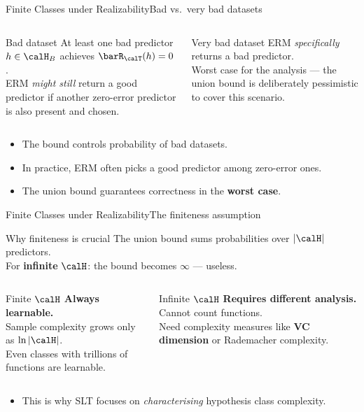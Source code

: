 \begin{frame}{Finite Classes under Realizability}{Bad vs.\ very bad datasets}
  \begin{columns}[T]
    \begin{alertblock}{Bad dataset}
      At least one bad predictor $h \in \calH_B$ achieves $\barR_\calT(h) = 0$.\\[4pt]
      ERM \emph{might still} return a good predictor if another zero-error predictor is
      also present and chosen.
    \end{alertblock}
    \begin{alertblock}{Very bad dataset}
      ERM \emph{specifically} returns a bad predictor.\\[4pt]
      Worst case for the analysis — the union bound is deliberately pessimistic to cover
      this scenario.
    \end{alertblock}
  \end{columns}
  \bigskip
  \begin{itemize}
    \item The bound controls probability of bad datasets.
    \item In practice, ERM often picks a good predictor among zero-error ones.
    \item The union bound guarantees correctness in the \textbf{worst case}.
  \end{itemize}
\end{frame}

\begin{frame}{Finite Classes under Realizability}{The finiteness assumption}
  \begin{alertblock}{Why finiteness is crucial}
    The union bound sums probabilities over $|\calH|$ predictors.\\
    For \textbf{infinite} $\calH$: the bound becomes $\infty$ — useless.
  \end{alertblock}
  \bigskip
  \begin{columns}[T]
    \begin{block}{Finite $\calH$}
      \textbf{Always learnable.}\\[4pt]
      Sample complexity grows only as $\ln|\calH|$.\\[4pt]
      Even classes with trillions of functions are learnable.
    \end{block}
    \begin{block}{Infinite $\calH$}
      \textbf{Requires different analysis.}\\[4pt]
      Cannot count functions.\\[4pt]
      Need complexity measures like \textbf{VC dimension} or Rademacher complexity.
    \end{block}
  \end{columns}
  \bigskip
  \begin{itemize}
    \item This is why SLT focuses on \emph{characterising} hypothesis class complexity.
  \end{itemize}
\end{frame}

